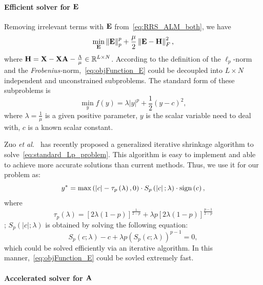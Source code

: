 \documentclass[a4paper]{article}
\begin{document}
\paragraph{Efficient solver for $\mathbf{E}$ }

Removing irrelevant terms with $\mathbf{E}$ from\ \eqref{eq:RRS_ALM_both},
we have
\begin{equation}
\min_{\mathbf{E}}\left\Vert \mathbf{E}\right\Vert _{p}^{p}+\frac{\mu}{2}\left\Vert \mathbf{E}-\mathbf{H}\right\Vert _{F}^{2},\label{eq:objFunction_E}
\end{equation}
where $\mathbf{H}=\mathbf{X}-\mathbf{X}\mathbf{A}-\frac{\Lambda}{\mu}\in\mathbb{R}^{L\times N}$.
According to the definition of the $\ell_{p}$-norm and the \emph{Frobenius-}norm,\ \eqref{eq:objFunction_E}
could be decoupled into $L\times N$ independent and unconstrained
subproblems. The standard form of these subproblems is 
\begin{equation}
\min_{y}f\left(y\right)=\lambda\left|y\right|^{p}+\frac{1}{2}\left(y-c\right)^{2},\label{eq:standard_Lp_problem}
\end{equation}
where $\lambda=\frac{1}{\mu}$ is a given positive parameter, $y$
is the scalar variable need to deal with, $c$ is a known scalar constant.

Zuo \emph{et al.\ }\cite{leiZhang_2013_ICCV_LpShrinkage}\emph{ }has
recently proposed a generalized iterative shrinkage algorithm to solve\ \eqref{eq:standard_Lp_problem}.
This algorithm is easy to implement and able to achieve more accurate
solutions than current methods. Thus, we use it for our problem as:
\begin{equation}
y^{*}=\max\left(\left|c\right|-\tau_{p}\left(\lambda\right),0\right)\cdot S_{p}\left(\left|c\right|;\lambda\right)\cdot\mathbf{\text{sign}}\left(c\right),\label{eq:GST_Lp_shrinkageSolver}
\end{equation}
where 
\[
\tau_{p}\left(\lambda\right)=\left[2\lambda\left(1-p\right)\right]^{\frac{1}{2-p}}+\lambda p\left[2\lambda\left(1-p\right)\right]^{\frac{p-1}{2-p}}
\]
; $S_{p}\left(\left|c\right|;\lambda\right)$ is obtained by solving
the following equation: 
\[
S_{p}\left(c;\lambda\right)-c+\lambda p\left(S_{p}\left(c;\lambda\right)\right)^{p-1}=0,
\]
which could be solved efficiently via an iterative algorithm. In this
manner,\ \eqref{eq:objFunction_E} could be sovled extremely fast.


\paragraph{Accelerated solver for $\mathbf{A}$ }
\end{document}
